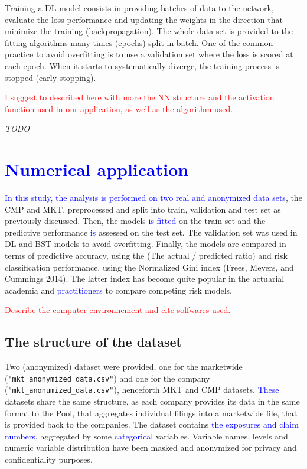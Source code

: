 \documentclass[
]{article}
\begin{document}
Training a DL model consists in providing batches of data to the
network, evaluate the loss performance and updating the weights in the
direction that minimize the training (backpropagation). The whole data
set is provided to the fitting algorithms many times (epochs) split in
batch. One of the common practice to avoid overfitting is to use a
validation set where the loss is scored at each epoch. When it starts to
systematically diverge, the training process is stopped (early
stopping).

\textcolor{red}{I suggest to described here with more the NN structure and the activation function used in our application, as well as the algorithm used. }

\emph{TODO}

\hypertarget{section}{%
\section{\texorpdfstring{\textcolor{blue}{Numerical application}}{}}\label{section}}

\textcolor{blue}{In this study, the analysis is performed on two real and anonymized data sets},
the CMP and MKT, preprocessed and split into train, validation and test
set as previously discussed. Then, the models
\textcolor{blue}{is fitted} on the train set and the predictive
performance \textcolor{blue}{is} assessed on the test set. The
validation set was used in DL and BST models to avoid overfitting.
Finally, the models are compared in terms of predictive accuracy, using
the (The actual / predicted ratio) and risk classification performance,
using the Normalized Gini index (Frees, Meyers, and Cummings 2014). The
latter index has become quite popular in the actuarial academia and
\textcolor{blue}{practitioners} to compare competing risk models.

\textcolor{red}{Describe the computer environnement and cite solfwares used.}

\hypertarget{the-structure-of-the-dataset}{%
\subsection{The structure of the
dataset}\label{the-structure-of-the-dataset}}

Two (anonymized) dataset were provided, one for the marketwide
(\texttt{"mkt\_anonymized\_data.csv"}) and one for the company
(\texttt{"mkt\_anonumized\_data.csv"}), henceforth MKT and CMP datasets.
\textcolor{blue}{These} datasets share the same structure, as each
company provides its data in the same format to the Pool, that
aggregates individual filings into a marketwide file, that is provided
back to the companies. The dataset contains
\textcolor{blue}{the exposures and claim numbers,} aggregated by some
\textcolor{blue}{categorical} variables. Variable names, levels and
numeric variable distribution have been masked and anonymized for
privacy and confidentiality purposes.
\end{document}
